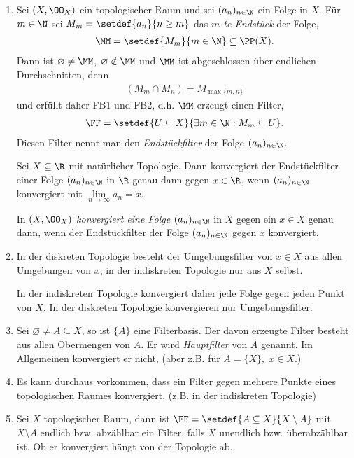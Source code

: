 \begin{bsp}
\label{1.5.4}
\begin{enumerate}
  \item Sei $(X,\OO_X)$ ein topologischer Raum und sei $(a_n)_{n\in\N}$ ein
  Folge in $X$. Für $m\in\N$ sei $M_m = \setdef{a_n}{n\ge m}$ das \emph{$m$-te
  Endstück} der Folge,
  \begin{align*}
  \MM = \setdef{M_m}{m\in\N}\subseteq \PP(X).
  \end{align*}
Dann ist $\varnothing\neq \MM$, $\varnothing\notin\MM$ und $\MM$
ist abgeschlossen über endlichen Durchschnitten, denn
\begin{align*}
(M_m\cap M_n) = M_{\max \{m,n\}}
\end{align*}
und erfüllt daher FB1 und FB2, d.h. $\MM$ erzeugt einen Filter,
\begin{align*}
\FF = \setdef{U\subseteq X}{\exists m\in\N : M_m \subseteq U}.
\end{align*}
Diesen Filter nennt man den \emph{Endstückfilter} der Folge $(a_n)_{n\in\N}$.

\begin{propn}[Problem]
Sei $X\subseteq \R$ mit natürlicher Topologie. Dann konvergiert der
Endstückfilter einer Folge $(a_n)_{n\in\N}$ in $\R$ genau dann gegen $x\in\R$,
wenn $(a_n)_{n\in\N}$ konvergiert mit $\lim\limits_{n\to\infty} a_n =
x$.\fishhere
\end{propn}

\begin{defn}
In $(X,\OO_X)$ \emph{konvergiert eine Folge} $(a_n)_{n\in\N}$ in $X$ gegen ein
$x\in X$ genau dann, wenn der Endstückfilter der Folge $(a_n)_{n\in\N}$ gegen $x$
konvergiert.\fishhere
\end{defn}
\item In der diskreten Topologie besteht der Umgebungsfilter von $x\in X$ aus
allen Umgebungen von $x$, in der indiskreten Topologie nur aus $X$ selbst.

In der indiskreten Topologie konvergiert daher jede Folge gegen jeden Punkt von
$X$. In der diskreten Topologie konvergieren nur Umgebungsfilter.
\item Sei $\varnothing\neq A\subseteq X$, so ist $\{A\}$ eine Filterbasis. Der
davon erzeugte Filter besteht aus allen Obermengen von $A$. Er wird
\emph{Hauptfilter} von $A$ genannt. Im Allgemeinen konvergiert er nicht, (aber
z.B. für $A= \{X\},\;x\in X$.)
\item Es kann durchaus vorkommen, dass ein Filter gegen mehrere Punkte eines
topologischen Raumes konvergiert. (z.B. in der indiskreten Topologie)
\item Sei $X$ topologischer Raum, dann ist $\FF = \setdef{A\subseteq
X}{X\setminus A}$ mit $X\setminus A$ endlich bzw. abzählbar ein
Filter, falls $X$ unendlich bzw. überabzählbar ist. Ob er konvergiert hängt von
der Topologie ab.\bsphere
\end{enumerate}
\end{bsp}

